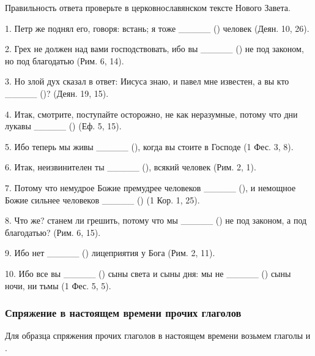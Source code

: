 \documentclass[11pt,a4paper,oneside]{memoir}
\begin{document}
    Правильность ответа проверьте в церковнославянском тексте Нового Завета.
    
    1. Петр же поднял его, говоря: встань; я тоже _____ ({}) человек (Деян. 10, 26).
    
    2. Грех не должен над вами господствовать, ибо вы _____ ({}) не под законом, но под благодатью (Рим. 6, 14).
    
    3. Но злой дух сказал в ответ: Иисуса знаю, и павел мне известен, а вы кто _____ ({})? (Деян. 19, 15).
    
    4. Итак, смотрите, поступайте осторожно, не как неразумные, потому что дни лукавы _____ ({}) (Еф. 5, 15).
    
    5. Ибо теперь мы живы _____ ({}), когда вы стоите в Господе (1 Фес. 3, 8).
    
    6. Итак, неизвинителен ты _____ ({}), всякий человек (Рим. 2, 1).
    
    7. Потому что немудрое Божие премудрее человеков _____ ({}), и немощное Божие сильнее человеков _____ ({}) (1 Кор. 1, 25).
    
    8. Что же? станем ли грешить, потому что мы _____ ({}) не под законом, а под благодатью? (Рим. 6, 15).
    
    9. Ибо нет _____ ({}) лицеприятия у Бога (Рим. 2, 11).
    
    10. Ибо все вы _____ ({}) сыны света и сыны дня: мы не _____ ({}) сыны ночи, ни тьмы (1 Фес. 5, 5).

                \subsubsection{Спряжение в настоящем времени прочих глаголов}

    Для образца спряжения прочих глаголов в настоящем времени возьмем глаголы {} и {}.
    
\end{document}
